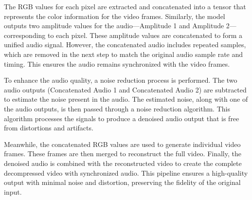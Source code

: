 \documentclass{ioereport}
\begin{document}
        The RGB values for each pixel are extracted and concatenated into a tensor that represents the color information for the video frames. Similarly, the model outputs two amplitude values for the audio—Amplitude 1 and Amplitude 2—corresponding to each pixel. These amplitude values are concatenated to form a unified audio signal. However, the concatenated audio includes repeated samples, which are removed in the next step to match the original audio sample rate and timing. This ensures the audio remains synchronized with the video frames.
        
        To enhance the audio quality, a noise reduction process is performed. The two audio outputs (Concatenated Audio 1 and Concatenated Audio 2) are subtracted to estimate the noise present in the audio. The estimated noise, along with one of the audio outputs, is then passed through a noise reduction algorithm. This algorithm processes the signals to produce a denoised audio output that is free from distortions and artifacts.
        
        Meanwhile, the concatenated RGB values are used to generate individual video frames. These frames are then merged to reconstruct the full video. Finally, the denoised audio is combined with the reconstructed video to create the complete decompressed video with synchronized audio. This pipeline ensures a high-quality output with minimal noise and distortion, preserving the fidelity of the original input.
\end{document}
